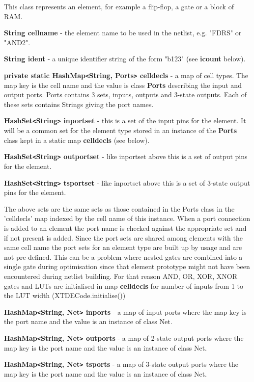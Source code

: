 
This class represents an element, for example a flip-flop,
a gate or a block of RAM.


{\bf String cellname} - the element name to be used in the netlist, e.g.
"FDRS" or "AND2".

{\bf String ident} - a unique identifier string of the form "b123" (see
{\bf icount} below).


{\bf private static HashMap\verb'<'String, Ports\verb'>' celldecls} -  a
map of cell types. The map key is the cell name and the value is class {\bf
Ports} describing the input and output ports. Ports contains 3 sets,
inputs, outputs and 3-state outputs. Each of these sets contains Strings
giving the port names.


{\bf HashSet\verb'<'String\verb'>' inportset} - this is a set of the input
pins for the element. It will be a common set for the element type stored
in an instance of the {\bf Ports} class kept in a static map {\bf
celldecls} (see below).

{\bf HashSet\verb'<'String\verb'>' outportset} - like inportset above this
is a set of output pins for the element.

{\bf HashSet\verb'<'String\verb'>' tsportset} -  like inportset above this
is a set of 3-state output pins for the element.

The above sets are the same sets as those contained in the Ports class in
the 'celldecls' map indexed by the cell name of this instance. When a port
connection is added to an element the port name is checked against the
appropriate set and if not present is added. Since the port sets are shared
among elements with the same cell name the port sets for an element type
are built up by usage and are not pre-defined. This can be a problem where
nested gates are combined into a single gate during optimisation since that
element prototype might not have been encountered during netlist building.
For that reason AND, OR, XOR, XNOR gates and LUTs are initialised in map
{\bf celldecls} for number of inputs from 1 to the LUT width
(XTDECode.initialise())

{\bf HashMap\verb'<'String, Net\verb'>' inports} - a map
of input ports where the map key is the port name and the value is an
instance of class Net.

{\bf HashMap\verb'<'String, Net\verb'>' outports} -  a
map of 2-state output ports where the map key is the port name and the
value is an instance of class Net.

{\bf HashMap\verb'<'String, Net\verb'>' tsports} -  a map
of 3-state output ports where the map key is the port name and the value
is an instance of class Net.

